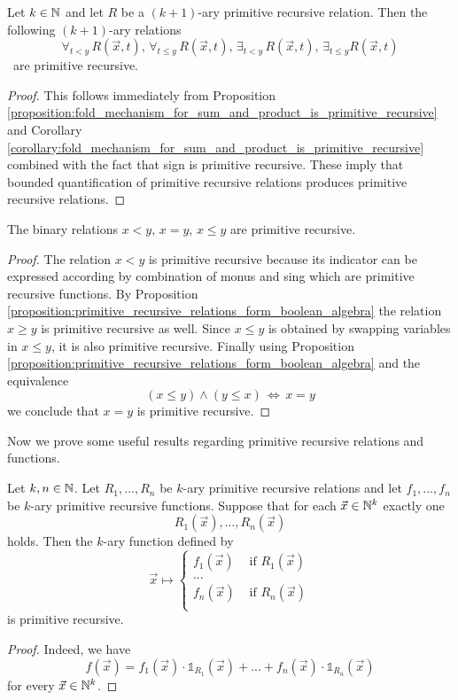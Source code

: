 \documentclass[10pt]{amsart}
\begin{document}
\begin{proposition}\label{proposition:bounded_quantifiers_are_primitive_recursive}
	Let $k\in {\mathbb N}$ and let $R$ be a $(k + 1)$-ary primitive recursive relation. Then the following $(k+1)$-ary relations
	$$\forall_{t < y}\,R(\vec{x},t),\,\forall_{t \leq y}\,R(\vec{x},t),\,\exists_{t < y}\,R(\vec{x},t),\,\exists_{t \leq y}R(\vec{x},t)$$\
	are primitive recursive.
\end{proposition}
\begin{proof}
	This follows immediately from Proposition \ref{proposition:fold_mechanism_for_sum_and_product_is_primitive_recursive} and Corollary \ref{corollary:fold_mechanism_for_sum_and_product_is_primitive_recursive} combined with the fact that sign is primitive recursive. These imply that bounded quantification of primitive recursive relations produces primitive recursive relations.
\end{proof}

\begin{proposition}\label{proposition:order_relations_are_primitive_recursive}
	The binary relations $x < y,\,x = y,\,x \leq y$ are primitive recursive.
\end{proposition}
\begin{proof}
	The relation $x < y$ is primitive recursive because its indicator can be expressed according by combination of monus and sing which are primitive recursive functions. By Proposition \ref{proposition:primitive_recursive_relations_form_boolean_algebra} the relation $x \geq y$ is primitive recursive as well. Since $x \leq y$ is obtained  by swapping variables in $x \leq y$, it is also primitive recursive. Finally using Proposition \ref{proposition:primitive_recursive_relations_form_boolean_algebra} and the equivalence
	$$\left(x \leq y\right)\wedge \left(y \leq x\right)\,\Leftrightarrow\,x=y$$
	we conclude that $x = y$ is primitive recursive.
\end{proof}
\noindent
Now we prove some useful results regarding primitive recursive relations and functions.

\begin{proposition}\label{proposition:primitive_recursive_alternative_produces_primitive_recursive_function}
	Let $k, n \in {\mathbb N}$. Let $R_1,...,R_n$ be $k$-ary primitive recursive relations and let $f_1,...,f_n$ be $k$-ary primitive recursive functions. Suppose that for each $\vec{x} \in {\mathbb N}^k$ exactly one
	$$R_1(\vec{x}),...,R_n(\vec{x})$$
	holds. Then the $k$-ary function defined by
	$$\vec{x} \mapsto
		\begin{cases}
			f_1(\vec{x}) & \mbox{ if }R_1(\vec{x}) \\
			...                                    \\
			f_n(\vec{x}) & \mbox{ if }R_n(\vec{x}) \\
		\end{cases}$$
	is primitive recursive.
\end{proposition}
\begin{proof}
	Indeed, we have
	$$f(\vec{x}) = f_1(\vec{x})\cdot \mathbb{1}_{R_1}(\vec{x}) + ... + f_n(\vec{x})\cdot \mathbb{1}_{R_n}(\vec{x})$$
	for every $\vec{x} \in {\mathbb N}^k$.
\end{proof}
\end{document}
